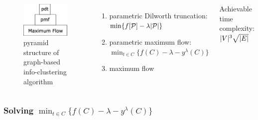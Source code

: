 \documentclass{beamer}
\begin{document}
\begin{frame}
\begin{columns}
\column{4cm}
\begin{figure}[!ht]
\centering
\includegraphics[width=4cm]{paper/pic/pdt.eps}
\caption{pyramid structure of graph-based info-clustering algorithm}\label{fig:ps}
\end{figure}
\column{6cm}
\begin{enumerate}
\item parametric Dilworth truncation: $\min \{f[\mathcal{P}] -\lambda \lvert\mathcal{P}\rvert\}$
\item parametric maximum flow: $\min_{t\in C} \{f(C) - \lambda - y^{\lambda}(C)\}$
\item maximum flow
\end{enumerate}
Achievable time complexity: $\lvert V\rvert^3 \sqrt{\lvert E\rvert}$
\end{columns}
\end{frame}
\begin{frame}
	\frametitle{Solving $\min_{t\in C} \{f(C) - \lambda - y^{\lambda}(C)\}$}
	\begin{columns}
		\column{5cm}
		\column{5cm}
	\end{columns}
	
\end{frame}
\end{document}
